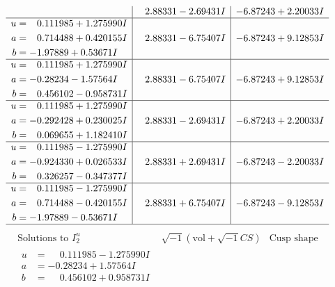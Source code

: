 \documentclass[1p]{elsarticle_modified}
\theoremstyle{definition}
\newcommand{\I}{\sqrt{-1}}
\begin{document}
$$\begin{array}{c|c|c}
 & \phantom{-}2.88331 - 2.69431 I & -6.87243 + 2.20033 I \\ \hline\begin{aligned}
u &= \phantom{-}0.111985 + 1.275990 I \\
a &= \phantom{-}0.714488 + 0.420155 I \\
b &= -1.97889 + 0.53671 I\end{aligned}
 & \phantom{-}2.88331 - 6.75407 I & -6.87243 + 9.12853 I \\ \hline\begin{aligned}
u &= \phantom{-}0.111985 + 1.275990 I \\
a &= -0.28234 - 1.57564 I \\
b &= \phantom{-}0.456102 - 0.958731 I\end{aligned}
 & \phantom{-}2.88331 - 6.75407 I & -6.87243 + 9.12853 I \\ \hline\begin{aligned}
u &= \phantom{-}0.111985 + 1.275990 I \\
a &= -0.292428 + 0.230025 I \\
b &= \phantom{-}0.069655 + 1.182410 I\end{aligned}
 & \phantom{-}2.88331 - 2.69431 I & -6.87243 + 2.20033 I \\ \hline\begin{aligned}
u &= \phantom{-}0.111985 - 1.275990 I \\
a &= -0.924330 + 0.026533 I \\
b &= \phantom{-}0.326257 - 0.347377 I\end{aligned}
 & \phantom{-}2.88331 + 2.69431 I & -6.87243 - 2.20033 I \\ \hline\begin{aligned}
u &= \phantom{-}0.111985 - 1.275990 I \\
a &= \phantom{-}0.714488 - 0.420155 I \\
b &= -1.97889 - 0.53671 I\end{aligned}
 & \phantom{-}2.88331 + 6.75407 I & -6.87243 - 9.12853 I\\
 \hline 
 \end{array}$$\newpage$$\begin{array}{c|c|c}  
\text{Solutions to }I^u_{2}& \I (\text{vol} + \sqrt{-1}CS) & \text{Cusp shape}\\
 \hline 
\begin{aligned}
u &= \phantom{-}0.111985 - 1.275990 I \\
a &= -0.28234 + 1.57564 I \\
b &= \phantom{-}0.456102 + 0.958731 I\end{aligned}

\end{array}$$
\end{document}
